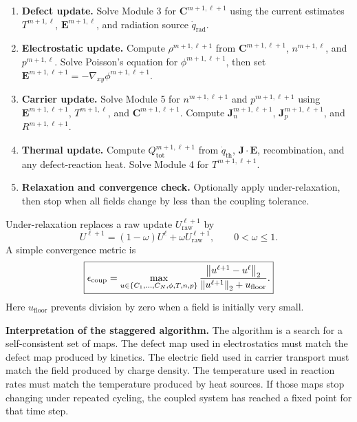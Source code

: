 \documentclass[11pt]{article}
\newcommand{\Evec}{\bm{E}}
\newcommand{\Jvec}{\bm{J}}
\newcommand{\Cvec}{\bm{C}}
\newcommand{\gradxy}{\nabla_{xy}}
\begin{document}
\begin{enumerate}[leftmargin=2em]
\item \textbf{Defect update.} Solve Module 3 for \(\Cvec^{m+1,\ell+1}\) using the current estimates \(T^{m+1,\ell}\), \(\Evec^{m+1,\ell}\), and radiation source \(\dot{q}_{\mathrm{rad}}\).
\item \textbf{Electrostatic update.} Compute \(\rho^{m+1,\ell+1}\) from \(\Cvec^{m+1,\ell+1}\), \(n^{m+1,\ell}\), and \(p^{m+1,\ell}\). Solve Poisson's equation for \(\phi^{m+1,\ell+1}\), then set \(\Evec^{m+1,\ell+1}=-\gradxy\phi^{m+1,\ell+1}\).
\item \textbf{Carrier update.} Solve Module 5 for \(n^{m+1,\ell+1}\) and \(p^{m+1,\ell+1}\) using \(\Evec^{m+1,\ell+1}\), \(T^{m+1,\ell}\), and \(\Cvec^{m+1,\ell+1}\). Compute \(\Jvec_n^{m+1,\ell+1}\), \(\Jvec_p^{m+1,\ell+1}\), and \(R^{m+1,\ell+1}\).
\item \textbf{Thermal update.} Compute \(Q_{\mathrm{tot}}^{m+1,\ell+1}\) from \(\dot{q}_{\mathrm{th}}\), \(\Jvec\cdot\Evec\), recombination, and any defect-reaction heat. Solve Module 4 for \(T^{m+1,\ell+1}\).
\item \textbf{Relaxation and convergence check.} Optionally apply under-relaxation, then stop when all fields change by less than the coupling tolerance.
\end{enumerate}

Under-relaxation replaces a raw update \(U_{\mathrm{raw}}^{\ell+1}\) by
\begin{equation}
\boxed{
U^{\ell+1}=(1-\omega)U^{\ell}+\omega U_{\mathrm{raw}}^{\ell+1},
\qquad 0<\omega\le 1.}
\label{eq:relaxation}
\end{equation}
A simple convergence metric is
\begin{equation}
\boxed{
\epsilon_{\mathrm{coup}}
=
\max_{u\in\{C_1,\ldots,C_N,\phi,T,n,p\}}
\frac{\norm{u^{\ell+1}-u^{\ell}}_2}{\norm{u^{\ell+1}}_2+u_{\mathrm{floor}}}.}
\label{eq:coupling_metric}
\end{equation}
Here \(u_{\mathrm{floor}}\) prevents division by zero when a field is initially very small.

\begin{physicsbox}
\textbf{Interpretation of the staggered algorithm.} The algorithm is a search for a self-consistent set of maps. The defect map used in electrostatics must match the defect map produced by kinetics. The electric field used in carrier transport must match the field produced by charge density. The temperature used in reaction rates must match the temperature produced by heat sources. If those maps stop changing under repeated cycling, the coupled system has reached a fixed point for that time step.
\end{physicsbox}
\end{document}
